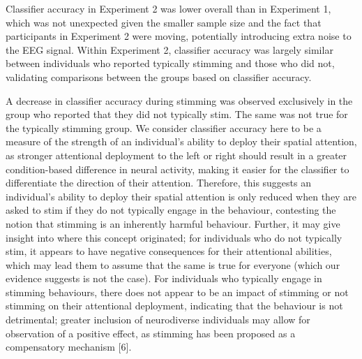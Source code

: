 \documentclass[
  letterpaper,
  DIV=11,
  numbers=noendperiod]{scrartcl}
\begin{document}
Classifier accuracy in Experiment 2 was lower overall than in Experiment
1, which was not unexpected given the smaller sample size and the fact
that participants in Experiment 2 were moving, potentially introducing
extra noise to the EEG signal. Within Experiment 2, classifier accuracy
was largely similar between individuals who reported typically stimming
and those who did not, validating comparisons between the groups based
on classifier accuracy.

A decrease in classifier accuracy during stimming was observed
exclusively in the group who reported that they did not typically stim.
The same was not true for the typically stimming group. We consider
classifier accuracy here to be a measure of the strength of an
individual's ability to deploy their spatial attention, as stronger
attentional deployment to the left or right should result in a greater
condition-based difference in neural activity, making it easier for the
classifier to differentiate the direction of their attention. Therefore,
this suggests an individual's ability to deploy their spatial attention
is only reduced when they are asked to stim if they do not typically
engage in the behaviour, contesting the notion that stimming is an
inherently harmful behaviour. Further, it may give insight into where
this concept originated; for individuals who do not typically stim, it
appears to have negative consequences for their attentional abilities,
which may lead them to assume that the same is true for everyone (which
our evidence suggests is not the case). For individuals who typically
engage in stimming behaviours, there does not appear to be an impact of
stimming or not stimming on their attentional deployment, indicating
that the behaviour is not detrimental; greater inclusion of neurodiverse
individuals may allow for observation of a positive effect, as stimming
has been proposed as a compensatory mechanism {[}6{]}.
\end{document}
